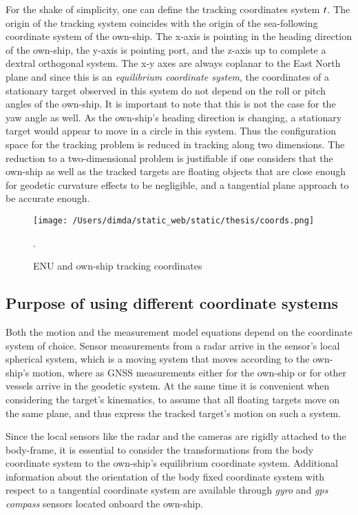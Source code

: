 For the shake of simplicity, one can define the tracking coordinates system $\\{t\\}$. The origin of the tracking system coincides with the origin of the sea-following coordinate system of the own-ship. The x-axis is pointing in the heading direction of the own-ship, the y-axis is pointing port, and the z-axis up to complete a dextral orthogonal system. The x-y axes are always coplanar to the East North plane and since this is an \emph{equilibrium coordinate system}, the coordinates of a stationary target observed in this system do not depend on the roll or pitch angles of the own-ship. It is important to note that this is not the case for the yaw angle as well. As the own-ship's heading direction is changing, a stationary target would appear to move in a circle in this system. Thus the configuration space for the tracking problem is reduced in tracking along two dimensions. The reduction to a two-dimensional problem is justifiable if one considers that the own-ship as well as the tracked targets are floating objects that are close enough for geodetic curvature effects to be negligible, and a tangential plane approach to be accurate enough.




\begin{figure}[H] 	
	\centering
	\texttt{[image: /Users/dimda/static\_web/static/thesis/coords.png]}
	\caption{ENU and own-ship tracking coordinates}.
	\label{fig:tracking_coords}	
\end{figure}

\subsection{Purpose of using different coordinate systems}

Both the motion and the measurement model equations depend on the coordinate system of choice. Sensor measurements from a radar arrive in the sensor's local spherical system, which is a moving system that moves according to the own-ship's motion, where as GNSS measurements either for the own-ship or for other vessels arrive in the geodetic system. At the same time it is convenient when considering the target's kinematics, to assume that all floating targets move on the same plane, and thus express the tracked target's motion on such a system.

Since the local sensors like the radar and the cameras are rigidly attached to the body-frame, it is essential to consider the transformations from the body coordinate system to the own-ship's equilibrium coordinate system. Additional information about the orientation of the body fixed coordinate system with respect to a tangential coordinate system are available through \emph{gyro} and \emph{gps compass} sensors located onboard the own-ship. 

